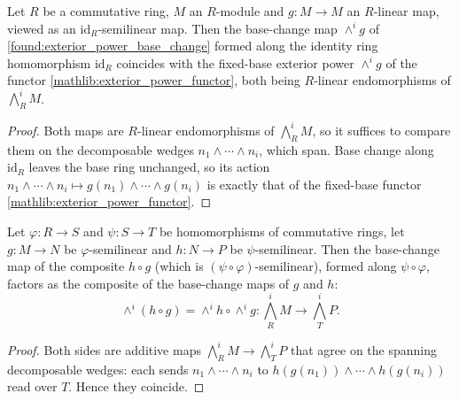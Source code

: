 \begin{lemma}\leanok
  \label{found:exterior_base_change_map_id}
  Let \(R\) be a commutative ring, \(M\) an \(R\)-module and \(g:M\to M\) an
  \(R\)-linear map, viewed as an \(\mathrm{id}_R\)-semilinear map.  Then the
  base-change map \(\wedge^i g\) of \cref{found:exterior_power_base_change} formed
  along the identity ring homomorphism \(\mathrm{id}_R\) coincides with the
  fixed-base exterior power \(\wedge^i g\) of the functor
  \cref{mathlib:exterior_power_functor}, both being \(R\)-linear endomorphisms of
  \(\bigwedge^i_R M\).
\end{lemma}

\begin{proof}\leanok
  Both maps are \(R\)-linear endomorphisms of \(\bigwedge^i_R M\), so it suffices
  to compare them on the decomposable wedges \(n_1\wedge\cdots\wedge n_i\), which
  span.  Base change along \(\mathrm{id}_R\) leaves the base ring unchanged, so its
  action \(n_1\wedge\cdots\wedge n_i\mapsto g(n_1)\wedge\cdots\wedge g(n_i)\) is
  exactly that of the fixed-base functor \cref{mathlib:exterior_power_functor}.
\end{proof}

\begin{lemma}\leanok
  \label{found:exterior_base_change_map_comp}
  Let \(\varphi:R\to S\) and \(\psi:S\to T\) be homomorphisms of commutative rings,
  let \(g:M\to N\) be \(\varphi\)-semilinear and \(h:N\to P\) be
  \(\psi\)-semilinear.  Then the base-change map of the composite \(h\circ g\)
  (which is \((\psi\circ\varphi)\)-semilinear), formed along \(\psi\circ\varphi\),
  factors as the composite of the base-change maps of \(g\) and \(h\):
  \[
    \wedge^i(h\circ g)=\wedge^i h\circ\wedge^i g
    :\textstyle\bigwedge^i_R M\to\bigwedge^i_T P .
  \]
\end{lemma}

\begin{proof}\leanok
  Both sides are additive maps \(\bigwedge^i_R M\to\bigwedge^i_T P\) that agree on
  the spanning decomposable wedges: each sends \(n_1\wedge\cdots\wedge n_i\) to
  \(h(g(n_1))\wedge\cdots\wedge h(g(n_i))\) read over \(T\).  Hence they coincide.
\end{proof}

